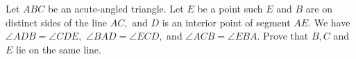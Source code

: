 Let $ ABC$ be an acute-angled triangle. Let $ E$ be a point such $ E$ and $ B$ are on distinct sides of the line $ AC,$ and $ D$ is an interior point of segment $ AE.$ We have $ \angle ADB = \angle CDE,$ $ \angle BAD = \angle ECD,$ and $ \angle ACB = \angle EBA.$ Prove that $ B, C$ and $ E$ lie on the same line.